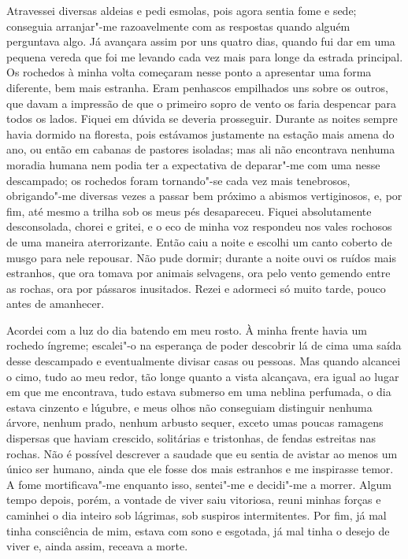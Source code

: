 Atravessei diversas aldeias e pedi esmolas, pois agora sentia fome e
sede; conseguia arranjar"-me razoavelmente com as respostas quando
alguém perguntava algo. Já avançara assim por uns quatro dias, quando
fui dar em uma pequena vereda que foi me levando cada vez mais para
longe da estrada principal. Os rochedos à minha volta começaram nesse
ponto a apresentar uma forma diferente, bem mais estranha. Eram
penhascos empilhados uns sobre os outros, que davam a impressão de que
o primeiro sopro de vento os faria despencar para todos os lados.
Fiquei em dúvida se deveria prosseguir. Durante as noites sempre havia
dormido na floresta, pois estávamos justamente na estação mais amena do
ano, ou então em cabanas de \mbox{pastores} \mbox{isoladas}; mas ali não encontrava
nenhuma moradia humana nem podia ter a expectativa de deparar"-me com
uma nesse descampado; os rochedos foram tornando"-se cada vez mais
tenebrosos, obrigando"-me diversas vezes a passar bem próximo a abismos
vertiginosos, e, por fim, até mesmo a trilha sob os meus pés
desapareceu. Fiquei absolutamente desconsolada, chorei e gritei, e o
eco de minha voz respondeu nos vales rochosos de uma maneira
aterrorizante. Então caiu a noite e escolhi um canto coberto de musgo
para nele repousar. Não pude dormir; durante a noite ouvi os ruídos
mais estranhos, que ora tomava por animais selvagens, ora pelo vento
gemendo entre as rochas, ora por pássaros inusitados. Rezei e adormeci
só muito tarde, pouco antes de amanhecer.

Acordei com a luz do dia batendo em meu rosto. À minha frente havia um
rochedo íngreme; escalei"-o na esperança de poder descobrir lá de cima
uma saída desse descampado e eventualmente divisar casas ou pessoas.
Mas quando alcancei o cimo, tudo ao meu redor, tão longe quanto a vista
alcançava, era igual ao lugar em que me encontrava, tudo estava
submerso em uma neblina perfumada, o dia estava cinzento e lúgubre, e
meus olhos não conseguiam distinguir nenhuma árvore, nenhum prado,
nenhum arbusto sequer, exceto umas poucas ramagens dispersas que haviam
crescido, solitárias e tristonhas, de fendas estreitas nas
rochas. Não é possível descrever a saudade que eu sentia de avistar ao
menos um único ser humano, ainda que ele fosse dos mais estranhos e me
inspirasse temor. A fome mortificava"-me enquanto isso, sentei"-me e
decidi"-me a morrer. Algum tempo depois, porém, a vontade de viver saiu
vitoriosa, reuni minhas forças e caminhei o dia inteiro sob lágrimas,
sob suspiros intermitentes. Por fim, já mal tinha consciência de mim,
estava com sono e esgotada, já mal tinha o desejo de viver e, ainda
assim, receava a morte.

